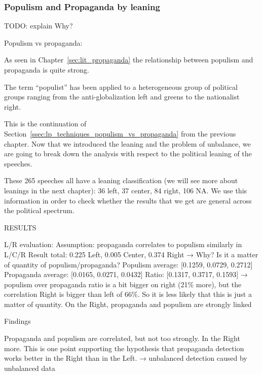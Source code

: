 

\subsubsection{Populism and Propaganda by leaning}

TODO: explain Why?

Populism vs propaganda:

As seen in Chapter~\ref{sec:lit_propaganda} the relationship between populism and propaganda is quite strong.

The term ``populist” has been applied to a heterogeneous group of political groups ranging from the anti-globalization left and greens to the nationalist right.~\citep{kuzio2010populism}


This is the continuation of Section~\ref{ssec:lp_techniques_populism_vs_propaganda} from the previous chapter. Now that we introduced the leaning and the problem of unbalance, we are going to break down the analysis with respect to the political leaning of the speeches.

These 265 speeches all have a leaning classification (we will see more about leanings in the next chapter): 36 left, 37 center, 84 right, 106 NA. We use this information in order to check whether the results that we get are general across the political spectrum.

RESULTS

L/R evaluation:
Assumption: propaganda correlates to populism similarly in L/C/R
Result total: 0.225 Left, 0.005 Center, 0.374 Right → Why? Is it a matter of quantity of populism/propaganda?
Populism average:  [0.1259, 0.0729, 0.2712]
Propaganda average: [0.0165, 0.0271, 0.0432]
Ratio: [0.1317, 0.3717, 0.1593] → populism over propaganda ratio is a bit bigger on right (21\% more), but the correlation Right is bigger than left of 66\%. So it is less likely that this is just a matter of quantity. On the Right, propaganda and populism are strongly linked

Findings

Propaganda and populism are correlated, but not too strongly. In the Right more. This is one point supporting the hypothesis that propaganda detection works better in the Right than in the Left. → unbalanced detection caused by unbalanced data


